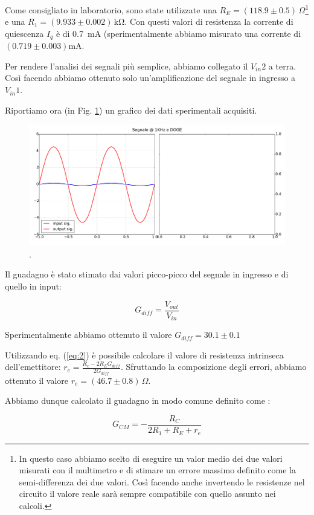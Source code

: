 Come consigliato in laboratorio, sono state utilizzate una $R_E=(118.9\pm0.5) \,\Omega$\footnote{In questo caso abbiamo scelto di eseguire un valor medio dei due valori misurati con il multimetro e di stimare un errore massimo definito come la semi-differenza dei due valori. Così facendo anche invertendo le resistenze nel circuito il valore reale sarà sempre compatibile con quello assunto nei calcoli.} e una $R_1= (9.933 \pm 0.002)\,\si{\kilo\ohm}$.
Con questi valori di resistenza la corrente di quiescenza $I_q$ è di \SI{0.7}{\milli\ampere} (sperimentalmente abbiamo misurato una corrente di $(0.719 \pm 0.003) \si{\milli\ampere}$.

Per rendere l'analisi dei segnali più semplice, abbiamo collegato il $V_{in}2$ a terra.
Così facendo abbiamo ottenuto solo un'amplificazione del segnale in ingresso a $V_{in}1$. 

Riportiamo ora (in Fig. \ref{fig:sig}) un grafico dei dati sperimentali acquisiti. 

\begin{figure}[h]
\centering
	\includegraphics[scale=0.425]{accontentati.pdf}
	\caption{.}
	\label{fig:sig}
\end{figure}

Il guadagno è stato stimato dai valori picco-picco del segnale in ingresso e di quello in input:

$$G_{diff}=\frac{V_{out}}{V_{in}}$$

Sperimentalmente abbiamo ottenuto il valore $G_{diff}=30.1 \pm 0.1$


Utilizzando eq. (\ref{eq:2}) è possibile calcolare il valore di resistenza intrinseca dell'emettitore: $r_e=\frac{R_c-2R_E G_{diff}}{2G_{diff}}$.
Sfruttando la composizione degli errori, abbiamo ottenuto il valore $r_e=(46.7\pm0.8)\,\Omega$.

Abbiamo dunque calcolato il guadagno in modo comune definito come :

\begin{equation}
G_{CM}=-\frac{R_C}{2R_1+R_E+	r_e}
\label{eq:3}
\end{equation}

